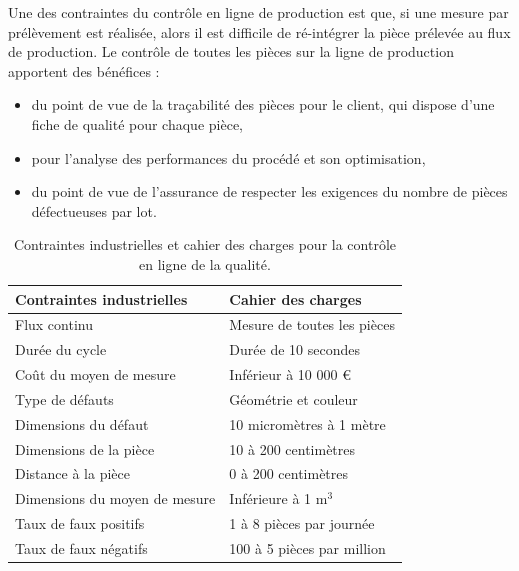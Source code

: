 Une des contraintes du contrôle en ligne de production est que, si une mesure par prélèvement est réalisée, alors il est difficile de ré-intégrer la pièce prélevée au flux de production.
Le contrôle de toutes les pièces sur la ligne de production apportent des bénéfices :
\begin{itemize}
	\item du point de vue de la traçabilité des pièces pour le client, qui dispose d'une fiche de qualité pour chaque pièce,
	\item pour l'analyse des performances du procédé et son optimisation,
	\item du point de vue de l'assurance de respecter les exigences du nombre de pièces défectueuses par lot.
\end{itemize}

\begin{table}[bthp]
	\centering
	\begin{tabular}{|l|l|}
		\arrayrulecolor{black}
		\hline
		Contraintes industrielles & Cahier des charges \\ \hline
		\hline
		Flux continu & Mesure de toutes les pièces \\ \hline
		Durée du cycle & Durée de 10 secondes \\ \hline
		Coût du moyen de mesure & Inférieur à 10 000 € \\ \hline
		\hline
		Type de défauts & Géométrie et couleur \\ \hline \hline
		Dimensions du défaut & 10 micromètres à 1 mètre \\ \hline
		Dimensions de la pièce & 10 à 200 centimètres \\ \hline
		\hline
		Distance à la pièce & 0 à 200 centimètres \\ \hline
		Dimensions du moyen de mesure & Inférieure à 1 m$^3$ \\ \hline
		\hline
		Taux de faux positifs & 1 à 8 pièces par journée \\ \hline
		Taux de faux négatifs & 100 à 5 pièces par million \\ \hline
	\end{tabular}
	\caption{Contraintes industrielles et cahier des charges pour la contrôle en ligne de la qualité.}
	\label{tab:industrial_constraints}
\end{table}

